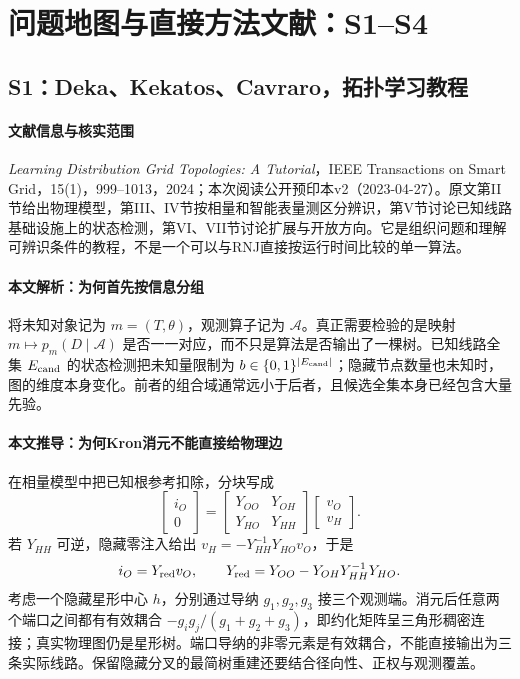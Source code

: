 \section{问题地图与直接方法文献：S1--S4}
\subsection{S1：Deka、Kekatos、Cavraro，拓扑学习教程}
\paragraph{文献信息与核实范围}
\emph{Learning Distribution Grid Topologies: A Tutorial}，IEEE Transactions on Smart Grid，15(1)，999--1013，2024；本次阅读公开预印本v2（2023-04-27）。原文第II节给出物理模型，第III、IV节按相量和智能表量测区分辨识，第V节讨论已知线路基础设施上的状态检测，第VI、VII节讨论扩展与开放方向\citep{S1}。它是组织问题和理解可辨识条件的教程，不是一个可以与RNJ直接按运行时间比较的单一算法。

\paragraph{本文解析：为何首先按信息分组}
将未知对象记为 $m=(T,\theta)$，观测算子记为 $\mathcal A$。真正需要检验的是映射 $m\mapsto p_m(D\mid\mathcal A)$ 是否一一对应，而不只是算法是否输出了一棵树。已知线路全集 $E_{\rm cand}$ 的状态检测把未知量限制为 $b\in\{0,1\}^{|E_{\rm cand}|}$；隐藏节点数量也未知时，图的维度本身变化。前者的组合域通常远小于后者，且候选全集本身已经包含大量先验。

\paragraph{本文推导：为何Kron消元不能直接给物理边}
在相量模型中把已知根参考扣除，分块写成
\begin{equation}
 \begin{bmatrix}i_O\\0\end{bmatrix}=
 \begin{bmatrix}Y_{OO}&Y_{OH}\\Y_{HO}&Y_{HH}\end{bmatrix}
 \begin{bmatrix}v_O\\v_H\end{bmatrix}.
\end{equation}
若 $Y_{HH}$ 可逆，隐藏零注入给出 $v_H=-Y_{HH}^{-1}Y_{HO}v_O$，于是
\begin{equation}
 i_O=Y_{\rm red}v_O,\qquad
 Y_{\rm red}=Y_{OO}-Y_{OH}Y_{HH}^{-1}Y_{HO}.
\end{equation}
考虑一个隐藏星形中心 $h$，分别通过导纳 $g_1,g_2,g_3$ 接三个观测端。消元后任意两个端口之间都有有效耦合 $-g_ig_j/(g_1+g_2+g_3)$，即约化矩阵呈三角形稠密连接；真实物理图仍是星形树。端口导纳的非零元素是有效耦合，不能直接输出为三条实际线路。保留隐藏分叉的最简树重建还要结合径向性、正权与观测覆盖。

